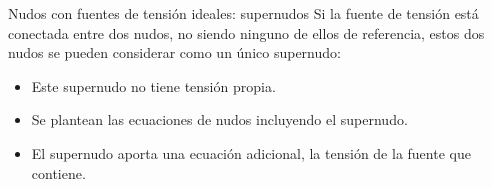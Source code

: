 \documentclass[aspectratio=169, usenames,svgnames,dvipsnames]{beamer}
\begin{document}
\begin{frame}[label={sec:org2b361dd}]{Nudos con fuentes de tensión ideales: supernudos}
Si la fuente de tensión está conectada entre dos nudos, no siendo ninguno de ellos de referencia, estos dos nudos se pueden considerar como un único supernudo:
\begin{itemize}
\item Este supernudo no tiene tensión propia.
\item Se plantean las ecuaciones de nudos incluyendo el supernudo.
\item El supernudo aporta una ecuación adicional, la tensión de la fuente que contiene.
\end{itemize}
\end{frame}
\end{document}
